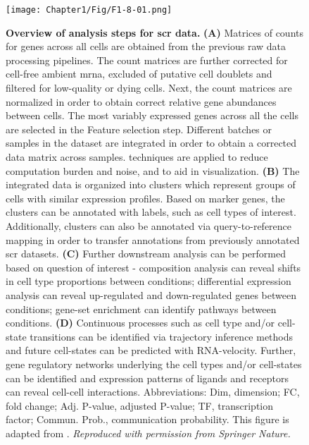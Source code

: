 \begin{figure}[H]
    \centering
    \texttt{[image: Chapter1/Fig/F1-8-01.png]}
    \caption[Workflow for preprocessing and analysis of  data]
    {\textbf{Overview of analysis steps for \gls{scr} data.} \textbf{(A)} Matrices of counts for genes across all cells are obtained from the previous raw data processing pipelines. The count matrices are further corrected for cell-free ambient \gls{mrna}, excluded of putative cell doublets and filtered for low-quality or dying cells. Next, the count matrices are normalized in order to obtain correct relative gene abundances between cells. The most variably expressed genes across all the cells are selected in the Feature selection step. Different batches or samples in the dataset are integrated in order to obtain a corrected data matrix across samples.  techniques are applied to reduce computation burden and noise, and to aid in visualization. \textbf{(B)} The integrated data is organized into clusters which represent groups of cells with similar expression profiles. Based on marker genes, the clusters can be annotated with labels, such as cell types of interest. Additionally, clusters can also be annotated via query-to-reference mapping in order to transfer annotations from previously annotated \gls{scr} datasets. \textbf{(C)} Further downstream analysis can be performed based on question of interest - composition analysis can reveal shifts in cell type proportions between conditions; differential expression analysis can reveal up-regulated and down-regulated genes between conditions; gene-set enrichment can identify pathways between conditions. \textbf{(D)} Continuous processes such as cell type and/or cell-state transitions can be identified via trajectory inference methods and future cell-states can be predicted with RNA-velocity. Further, gene regulatory networks underlying the cell types and/or cell-states can be identified and expression patterns of ligands and receptors can reveal cell-cell interactions. Abbreviations: Dim, dimension; FC, fold change; Adj. P-value, adjusted P-value; TF, transcription factor; Commun. Prob., communication probability. This figure is adapted from \textbf{\cite{heumos_best_2023,weiler_guide_2022,armingol_deciphering_2021}}.\textit{ Reproduced with permission from Springer Nature.}}
    \label{fig:chp1_scrna-workflow}
\end{figure}

